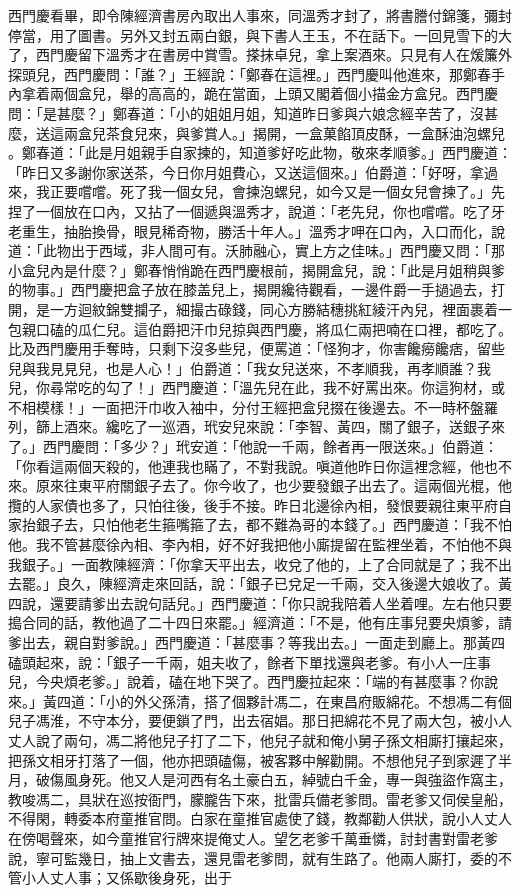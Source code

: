 西門慶看畢，即令陳經濟書房內取出人事來，同溫秀才封了，將書謄付錦箋，彌封停當，用了圖書。另外又封五兩白銀，與下書人王玉，不在話下。一回見雪下的大了，西門慶留下溫秀才在書房中賞雪。搽抹卓兒，拿上案酒來。只見有人在煖簾外探頭兒，西門慶問：「誰？」王經說：「鄭春在這裡。」西門慶叫他進來，那鄭春手內拿着兩個盒兒，舉的高高的，跪在當面，上頭又閣着個小描金方盒兒。西門慶問：「是甚麼？」鄭春道：「小的姐姐月姐，知道昨日爹與六娘念經辛苦了，沒甚麼，送這兩盒兒茶食兒來，與爹賞人。」揭開，一盒菓餡頂皮酥，一盒酥油泡螺兒 。鄭春道：「此是月姐親手自家揀的，知道爹好吃此物，敬來孝順爹。」西門慶道：「昨日又多謝你家送茶，今日你月姐費心，又送這個來。」伯爵道：「好呀，拿過來，我正要嚐嚐。死了我一個女兒，會揀泡螺兒，如今又是一個女兒會揀了。」先捏了一個放在口內，又拈了一個遞與溫秀才，說道：「老先兒，你也嚐嚐。吃了牙老重生，抽胎換骨，眼見稀奇物，勝活十年人。」溫秀才呷在口內，入口而化，說道：「此物出于西域，非人間可有。沃肺融心，實上方之佳味。」西門慶又問：「那小盒兒內是什麼？」鄭春悄悄跪在西門慶根前，揭開盒兒，說：「此是月姐稍與爹的物事。」西門慶把盒子放在膝盖兒上，揭開纔待觀看，一邊件爵一手撾過去，打開，是一方迴紋錦雙攔子，細撮古碌錢，同心方勝結穗挑紅綾汗內兒，裡面裹着一包親口磕的瓜仁兒。這伯爵把汗巾兒掠與西門慶，將瓜仁兩把喃在口裡，都吃了。比及西門慶用手奪時，只剩下沒多些兒，便罵道：「怪狗才，你害饞癆饞痞，留些兒與我見見兒，也是人心！」伯爵道：「我女兒送來，不孝順我，再孝順誰？我兒，你尋常吃的勾了！」西門慶道：「溫先兒在此，我不好罵出來。你這狗材，或不相模樣！」一面把汗巾收入袖中，分付王經把盒兒掇在後邊去。不一時杯盤羅列，篩上酒來。纔吃了一巡酒，玳安兒來說：「李智、黃四，關了銀子，送銀子來了。」西門慶問：「多少？」玳安道：「他說一千兩，餘者再一限送來。」伯爵道：「你看這兩個天殺的，他連我也瞞了，不對我說。嗔道他昨日你這裡念經，他也不來。原來往東平府關銀子去了。你今收了，也少要發銀子出去了。這兩個光棍，他攬的人家債也多了，只怕往後，後手不接。昨日北邊徐內相，發恨要親往東平府自家抬銀子去，只怕他老生箍嘴箍了去，都不難為哥的本錢了。」西門慶道：「我不怕他。我不管甚麼徐內相、李內相，好不好我把他小廝提留在監裡坐着，不怕他不與我銀子。」一面教陳經濟：「你拿天平出去，收兌了他的，上了合同就是了；我不出去罷。」良久，陳經濟走來回話，說：「銀子已兌足一千兩，交入後邊大娘收了。黃四說，還要請爹出去說句話兒。」西門慶道：「你只說我陪着人坐着哩。左右他只要搗合同的話，教他過了二十四日來罷。」經濟道：「不是，他有庄事兒要央煩爹，請爹出去，親自對爹說。」西門慶道：「甚麼事？等我出去。」一面走到廳上。那黃四磕頭起來，說：「銀子一千兩，姐夫收了，餘者下單找還與老爹。有小人一庄事兒，今央煩老爹。」說着，磕在地下哭了。西門慶拉起來：「端的有甚麼事？你說來。」黃四道：「小的外父孫清，搭了個夥計馮二，在東昌府販綿花。不想馮二有個兒子馮淮，不守本分，要便鎖了門，出去宿娼。那日把綿花不見了兩大包，被小人丈人說了兩句，馮二將他兒子打了二下，他兒子就和俺小舅子孫文相廝打攘起來，把孫文相牙打落了一個，他亦把頭磕傷，被客夥中解勸開。不想他兒子到家遲了半月，破傷風身死。他又人是河西有名土豪白五，綽號白千金，專一與強盜作窩主，教唆馮二，具狀在巡按衙門，朦朧告下來，批雷兵備老爹問。雷老爹又伺侯皇船，不得閑，轉委本府童推官問。白家在童推官處使了錢，教鄰勸人供狀，說小人丈人在傍喝聲來，如今童推官行牌來提俺丈人。望乞老爹千萬垂憐，討封書對雷老爹說，寧可監幾日，抽上文書去，還見雷老爹問，就有生路了。他兩人廝打，委的不管小人丈人事；又係歇後身死，出于